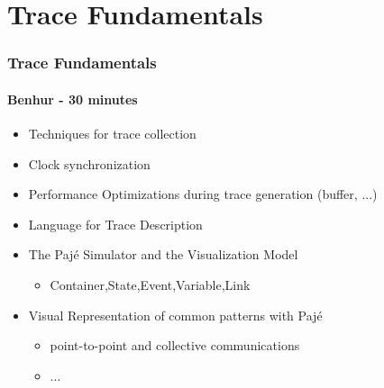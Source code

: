 \section{Trace Fundamentals}

\frame
{
  \frametitle{Trace Fundamentals}
  \framesubtitle{Benhur - 30 minutes}

  \begin{itemize}
  \item Techniques for trace collection
  \item Clock synchronization
  \item Performance Optimizations during trace generation (buffer, ...)
  \item Language for Trace Description 
  \item The Paj\'e Simulator and the Visualization Model
       \begin{itemize}
       \item Container,State,Event,Variable,Link
       \end{itemize}
  \item Visual Representation of common patterns with Paj\'e
    \begin{itemize}
    \item point-to-point and collective communications
    \item ...
    \end{itemize}
  \end{itemize}
}
